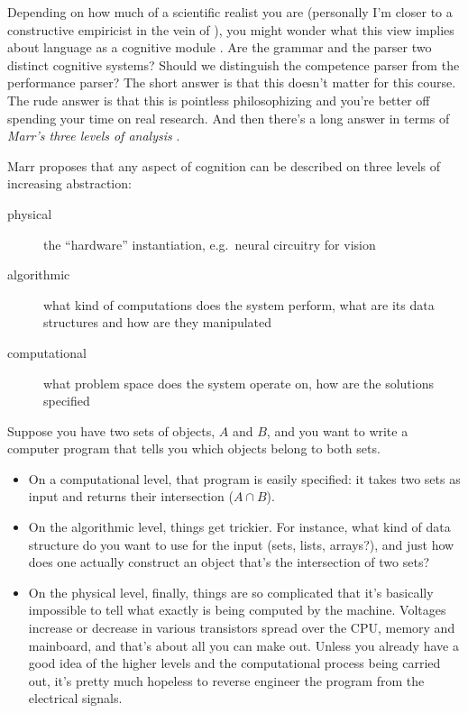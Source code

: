 Depending on how much of a scientific realist you are (personally I'm closer to a constructive empiricist in the vein of \citealt{Fraassen80}), you might wonder what this view implies about language as a cognitive module \citep[cf.][]{Chomsky86a, Fodor83}.
Are the grammar and the parser two distinct cognitive systems?
Should we distinguish the competence parser from the performance parser?
The short answer is that this doesn't matter for this course.
The rude answer is that this is pointless philosophizing and you're better off spending your time on real research.
And then there's a long answer in terms of \emph{Marr's three levels of analysis} \citep{MarrPoggio76}.

Marr proposes that any aspect of cognition can be described on three levels of increasing abstraction:
%
\begin{description}
    \item[physical] the ``hardware'' instantiation, e.g.\ neural circuitry for vision
    \item[algorithmic] what kind of computations does the system perform, what are its data structures and how are they manipulated
    \item[computational] what problem space does the system operate on, how are the solutions specified
\end{description}
%
\begin{examplebox}
    Suppose you have two sets of objects, $A$ and $B$, and you want to write a computer program that tells you which objects belong to both sets.
    \begin{itemize}
        \item On a computational level, that program is easily specified: it takes two sets as input and returns their intersection ($A \cap B$).
        \item On the algorithmic level, things get trickier.
        For instance, what kind of data structure do you want to use for the input (sets, lists, arrays?), and just how does one actually construct an object that's the intersection of two sets?
    \item On the physical level, finally, things are so complicated that it's basically impossible to tell what exactly is being computed by the machine.
        Voltages increase or decrease in various transistors spread over the CPU, memory and mainboard, and that's about all you can make out.
        Unless you already have a good idea of the higher levels and the computational process being carried out, it's pretty much hopeless to reverse engineer the program from the electrical signals.
    \end{itemize}
\end{examplebox}
